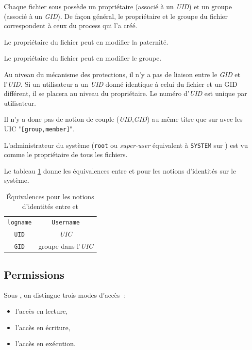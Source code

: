 {Chaque fichier sous {\Unix} poss{\`e}de un propri{\'e}taire (associ{\'e} {\`a} un
{\sl UID}) et un groupe (associ{\'e} {\`a} un {\sl GID}). De fa\c{c}on g{\'e}n{\'e}ral, le
propri{\'e}taire et le groupe du fichier correspondent {\`a} ceux du process qui
l'a cr{\'e}{\'e}.

Le propri{\'e}taire du fichier peut en modifier la paternit{\'e}.

Le propri{\'e}taire du fichier peut en modifier le groupe.

Au niveau du m{\'e}canisme des protections, il n'y a pas de liaison entre le
{\sl GID} et l'{\sl UID}. Si un utilisateur a un {\sl UID} donn{\'e}
identique {\`a} celui du fichier et un GID diff{\'e}rent, il se placera au
niveau du propri{\'e}taire. Le num{\'e}ro d'{\sl UID} est unique par
utilisateur.

Il n'y a donc pas de notion de couple ({\sl UID},{\sl GID}) au m{\^e}me
titre que sur {\OpenVMS} avec les UIC "{\tt [group,member]}".

L'administrateur du syst{\`e}me ({\tt root} ou {\sl super-user} {\'e}quivalent {\`a}
{\tt SYSTEM} sur {\OpenVMS}) est vu comme le propri{\'e}taire de tous les
fichiers.

Le tableau \ref{tab-cmds-equiv-root} donne les {\'e}quivalences entre {\Unix}
et {\OpenVMS} pour les notions d'identit{\'e}s sur le syst{\`e}me.

\begin{table}[hbtp]
\centering
\begin{tabular}{|c|c|}
	\hline
		{\Unix}			&	{\OpenVMS}				\\
	\hline \hline
		{\tt logname}	&	{\tt Username}			\\
	\hline
		{\tt UID}		&	{\sl UIC}				\\
	\hline
		{\tt GID}		&	groupe dans l'{\sl UIC}	\\
	\hline
\end{tabular}
\caption{\label{tab-cmds-equiv-root}\'{E}quivalences pour les notions d'identit{\'e}s
entre {\Unix} et {\OpenVMS}}
\end{table}

\subsection{Permissions}

Sous {\Unix}, on distingue trois modes
d'acc{\`e}s~:
\begin{itemize}
	\item l'acc{\`e}s en lecture,
	\item l'acc{\`e}s en {\'e}criture,
	\item l'acc{\`e}s en ex{\'e}cution.
\end{itemize}

}
